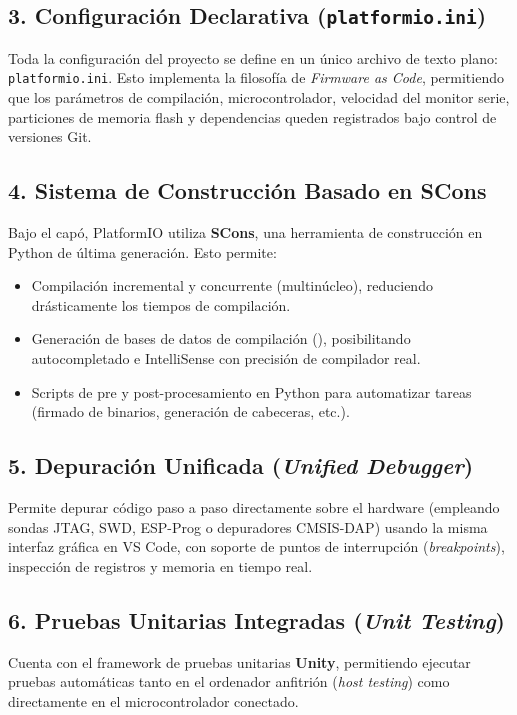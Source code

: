 \documentclass[12pt,a4paper]{article}
\begin{document}
\subsection{3. Configuración Declarativa (\texttt{platformio.ini})}
Toda la configuración del proyecto se define en un único archivo de texto plano: \texttt{platformio.ini}. Esto implementa la filosofía de \textit{Firmware as Code}, permitiendo que los parámetros de compilación, microcontrolador, velocidad del monitor serie, particiones de memoria flash y dependencias queden registrados bajo control de versiones Git.

\subsection{4. Sistema de Construcción Basado en SCons}
Bajo el capó, PlatformIO utiliza \textbf{SCons}, una herramienta de construcción en Python de última generación. Esto permite:
\begin{itemize}
    \item Compilación incremental y concurrente (multinúcleo), reduciendo drásticamente los tiempos de compilación.
    \item Generación de bases de datos de compilación (), posibilitando autocompletado e IntelliSense con precisión de compilador real.
    \item Scripts de pre y post-procesamiento en Python para automatizar tareas (firmado de binarios, generación de cabeceras, etc.).
\end{itemize}

\subsection{5. Depuración Unificada (\textit{Unified Debugger})}
Permite depurar código paso a paso directamente sobre el hardware (empleando sondas JTAG, SWD, ESP-Prog o depuradores CMSIS-DAP) usando la misma interfaz gráfica en VS Code, con soporte de puntos de interrupción (\textit{breakpoints}), inspección de registros y memoria en tiempo real.

\subsection{6. Pruebas Unitarias Integradas (\textit{Unit Testing})}
Cuenta con el framework de pruebas unitarias \textbf{Unity}, permitiendo ejecutar pruebas automáticas tanto en el ordenador anfitrión (\textit{host testing}) como directamente en el microcontrolador conectado.
\end{document}
